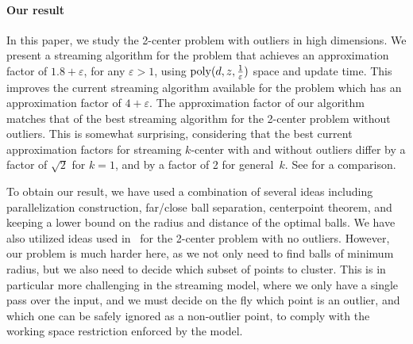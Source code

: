 \documentclass[envcountsame]{cls/cccg15}
\renewcommand{\O}{\ensuremath{{O}}}
\newcommand{\poly}{\mathop{\mathrm{poly}}}
\newcommand{\eps}{\varepsilon}
\newcommand{\REM}[1]{}
\begin{document}
\paragraph{Our result}
In this paper, we study the 2-center problem with outliers in high dimensions.
We present a streaming algorithm for the problem that achieves
an approximation factor of $1.8 + \eps$, for any $\eps > 1$,
using $\poly(d, z, {1 \over \eps})$ space and update time.
This improves the current streaming algorithm available for the problem
which has an approximation factor of $4+\eps$.
The approximation factor of our algorithm matches
that of the best streaming algorithm for the 2-center problem without outliers.
This is somewhat surprising, considering that 
the best current approximation factors for streaming $k$-center with and without outliers 
differ by a factor of $\sqrt{2}$ for $k=1$,
and by a factor of 2  for general~$k$. %
See  for a comparison.

To obtain our result, we have used a combination of several ideas
including parallelization construction, far/close ball separation, centerpoint theorem,
and keeping a lower bound on the radius and distance of the optimal balls.
We have also utilized ideas used in~\cite{kim2014improved} 
for the 2-center problem with no outliers.
However, our problem is much harder here, %
as we not only need to find balls of minimum radius, 
but we also need to decide which subset of points to cluster.
This is in particular more challenging in the streaming model,
where we only have a single pass over the input, and we must decide on the fly
which point is an outlier, 
and which one can be safely ignored as a non-outlier point,
to comply with the working space restriction enforced by the model.


\REM{
The rest of this paper is organized as follows.
In Section~\ref{sec:1-center}, we give a simple $2$-approximation algorithm for 
the 1-center problem with outliers that uses $\O(z^2 + zd)$ space.
In the next section, we show a $(1.8 + \eps)$-approximation
streaming algorithm for 2-center with $z$ outliers in high dimensions. 
}


\end{document}
